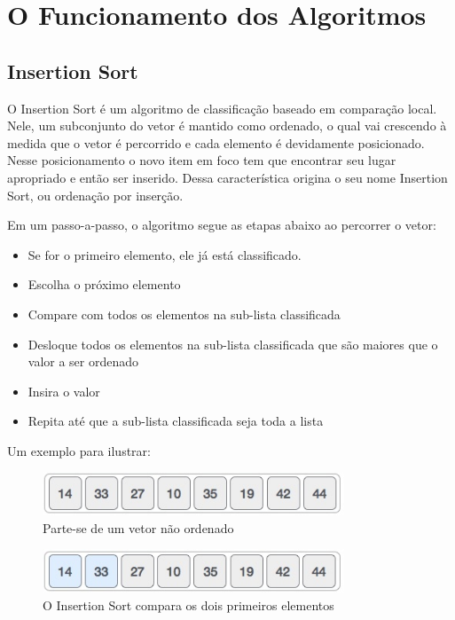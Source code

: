 
\chapter{O Funcionamento dos Algoritmos}

\section{Insertion Sort}

O Insertion Sort é um algoritmo de classificação baseado em comparação local. Nele, um subconjunto do vetor é mantido como ordenado, o qual vai crescendo à medida que o vetor é percorrido e cada elemento é devidamente posicionado. Nesse posicionamento o novo item em foco tem que encontrar seu lugar apropriado e então ser inserido. Dessa característica origina o seu nome Insertion Sort, ou ordenação por inserção.

Em um passo-a-passo, o algoritmo segue as etapas abaixo ao percorrer o vetor:

\begin{itemize}

\item Se for o primeiro elemento, ele já está classificado.
\item Escolha o próximo elemento
\item Compare com todos os elementos na sub-lista classificada
\item Desloque todos os elementos na sub-lista classificada que são maiores que o valor a ser ordenado
\item Insira o valor
\item Repita até que a sub-lista classificada seja toda a lista

\end{itemize}

Um exemplo para ilustrar:

\begin{figure}[!htb]
\centering
\includegraphics[width=9cm]{img/insertion_sort_1.jpg}
\caption{Parte-se de um vetor não ordenado}
\label{fig:insertion1}
\end{figure}

\begin{figure}[!htb]
\centering
\includegraphics[width=9cm]{img/insertion_sort_2.jpg}
\caption{O Insertion Sort compara os dois primeiros elementos}
\label{fig:insertion2}
\end{figure}


